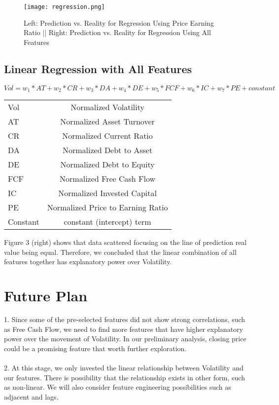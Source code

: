 \documentclass[a4paper]{article}
\begin{document}
\begin{figure}[h]
\centering
\texttt{[image: regression.png]}
\caption{\label{fig:scatter plot}Left: Prediction vs. Reality for Regression Using Price Earning Ratio || Right: Prediction vs. Reality for Regression Using All Features}
\end{figure}

\subsection{Linear Regression with All Features}
\begin{equation}
Vol = w_1*AT+w_2*CR+w_3*DA+w_4*DE+w_5*FCF+w_6*IC+w_7*PE+constant
\end{equation}
\begin{center}
\begin{tabular}{ l | c  }
 \hline
Vol & Normalized Volatility\\
AT & Normalized Asset Turnover\\
CR & Normalized Current Ratio\\
DA & Normalized Debt to Asset\\
DE & Normalized Debt to Equity\\
FCF & Normalized Free Cash Flow\\
IC & Normalized Invested Capital\\
PE & Normalized Price to Earning Ratio\\
Constant & constant (intercept) term\\
\hline
 \end{tabular}
\end{center}

Figure 3 (right) shows that data scattered focusing on the line of prediction real value being equal. Therefore, we concluded that the linear combination of all features together has explanatory power over Volatility.



\section{Future Plan}
1. Since some of the pre-selected features did not show strong correlations, such as Free Cash Flow, we need to find more features that have higher explanatory power over the movement of Volatility. In our preliminary analysis, closing price could be a promising feature that worth further exploration.
\\\\2. At this stage, we only invested the linear relationship between Volatility and our features. There is possibility that the relationship exists in other form, such as non-linear. We will also consider feature engineering possibilities such as adjacent and lags.
\end{document}
